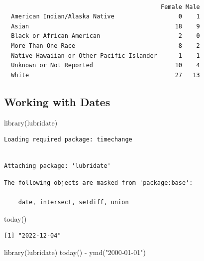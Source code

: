 \documentclass[
  letterpaper,
  DIV=11,
  numbers=noendperiod]{scrartcl}
\newenvironment{Shaded}{\begin{snugshade}}{\end{snugshade}}
\newcommand{\FunctionTok}[1]{\textcolor[rgb]{0.28,0.35,0.67}{#1}}
\newcommand{\NormalTok}[1]{\textcolor[rgb]{0.00,0.23,0.31}{#1}}
\newcommand{\SpecialCharTok}[1]{\textcolor[rgb]{0.37,0.37,0.37}{#1}}
\newcommand{\StringTok}[1]{\textcolor[rgb]{0.13,0.47,0.30}{#1}}
\begin{document}
\begin{verbatim}
                                           
                                            Female Male
  American Indian/Alaska Native                  0    1
  Asian                                         18    9
  Black or African American                      2    0
  More Than One Race                             8    2
  Native Hawaiian or Other Pacific Islander      1    1
  Unknown or Not Reported                       10    4
  White                                         27   13
\end{verbatim}

\hypertarget{working-with-dates}{%
\subsection{Working with Dates}\label{working-with-dates}}

\begin{Shaded}
\begin{Highlighting}[]
\FunctionTok{library}\NormalTok{(lubridate)}
\end{Highlighting}
\end{Shaded}

\begin{verbatim}
Loading required package: timechange
\end{verbatim}

\begin{verbatim}

Attaching package: 'lubridate'
\end{verbatim}

\begin{verbatim}
The following objects are masked from 'package:base':

    date, intersect, setdiff, union
\end{verbatim}

\begin{Shaded}
\begin{Highlighting}[]
\FunctionTok{today}\NormalTok{()}
\end{Highlighting}
\end{Shaded}

\begin{verbatim}
[1] "2022-12-04"
\end{verbatim}

\begin{Shaded}
\begin{Highlighting}[]
\FunctionTok{library}\NormalTok{(lubridate)}
\FunctionTok{today}\NormalTok{() }\SpecialCharTok{{-}} \FunctionTok{ymd}\NormalTok{(}\StringTok{"2000{-}01{-}01"}\NormalTok{)}
\end{Highlighting}
\end{Shaded}
\end{document}
